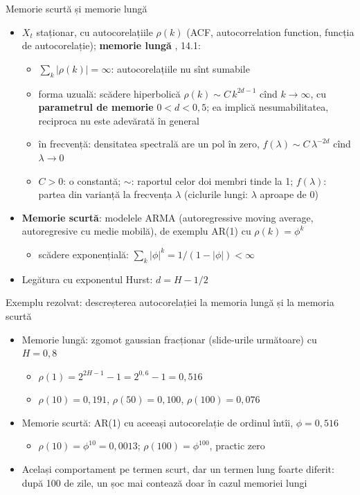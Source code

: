 \begin{frame}{Memorie scurtă și memorie lungă}
\itemsize{\small}
\begin{itemize}
    \item $X_t$ staționar, cu autocorelațiile $\rho(k)$ (ACF, autocorrelation function, funcția de autocorelație); \textbf{memorie lungă} , 14.1:
    \begin{itemize}
        \item $\sum_{k} |\rho(k)| = \infty$: autocorelațiile nu sînt sumabile
        \item forma uzuală: scădere hiperbolică $\rho(k) \sim C\,k^{2d - 1}$ cînd $k \to \infty$, cu \textbf{parametrul de memorie} $0 < d < 0{,}5$; ea implică nesumabilitatea, reciproca nu este adevărată în general
        \item în frecvență: densitatea spectrală are un pol în zero, $f(\lambda) \sim C\,\lambda^{-2d}$ cînd $\lambda \to 0$
        \item $C > 0$: o constantă; $\sim$: raportul celor doi membri tinde la 1; $f(\lambda)$: partea din varianță la frecvența $\lambda$ (ciclurile lungi: $\lambda$ aproape de 0)
    \end{itemize}
    \item \textbf{Memorie scurtă}: modelele ARMA (autoregressive moving average, autoregresive cu medie mobilă), de exemplu AR(1) cu $\rho(k) = \phi^k$
    \begin{itemize}
        \item scădere exponențială: $\sum_k |\phi|^k = 1/(1 - |\phi|) < \infty$
    \end{itemize}
    \item Legătura cu exponentul Hurst: $d = H - 1/2$
\end{itemize}
\end{frame}

\begin{frame}{Exemplu rezolvat: descreșterea autocorelației la memoria lungă și la memoria scurtă}
\itemsize{\small}
\begin{itemize}
    \item Memorie lungă: zgomot gaussian fracționar (slide-urile următoare) cu $H = 0{,}8$
    \begin{itemize}
        \item $\rho(1) = 2^{2H - 1} - 1 = 2^{0{,}6} - 1 = 0{,}516$
        \item $\rho(10) = 0{,}191$, $\rho(50) = 0{,}100$, $\rho(100) = 0{,}076$
    \end{itemize}
    \item Memorie scurtă: AR(1) cu aceeași autocorelație de ordinul întîi, $\phi = 0{,}516$
    \begin{itemize}
        \item $\rho(10) = \phi^{10} = 0{,}0013$; $\rho(100) = \phi^{100}$, practic zero
    \end{itemize}
    \item Același comportament pe termen scurt, dar un termen lung foarte diferit: după 100 de zile, un șoc mai contează doar în cazul memoriei lungi
\end{itemize}
\end{frame}

